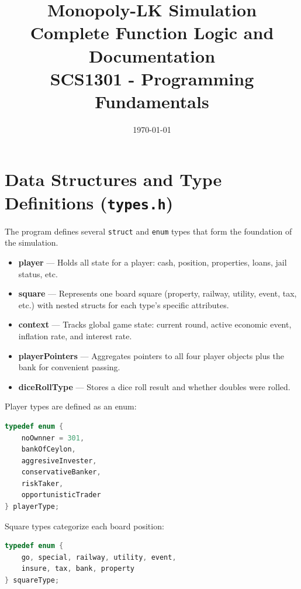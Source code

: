 \documentclass[12pt,a4paper]{article}
\title{
    \textbf{Monopoly-LK Simulation} \\
    \large Complete Function Logic and Documentation \\
    \vspace{0.5cm}
    \small SCS1301 - Programming Fundamentals
}
\author{}
\date{\today}
\begin{document}
\maketitle
\tableofcontents
\newpage

\section{Data Structures and Type Definitions (\texttt{types.h})}

The program defines several \texttt{struct} and \texttt{enum} types that form the foundation of the simulation.

\begin{tcolorbox}[colback=gray!10, colframe=gray!60, title=\textbf{Key Data Structures}]
\begin{itemize}[noitemsep]
    \item \textbf{player} --- Holds all state for a player: cash, position, properties, loans, jail status, etc.
    \item \textbf{square} --- Represents one board square (property, railway, utility, event, tax, etc.) with nested structs for each type's specific attributes.
    \item \textbf{context} --- Tracks global game state: current round, active economic event, inflation rate, and interest rate.
    \item \textbf{playerPointers} --- Aggregates pointers to all four player objects plus the bank for convenient passing.
    \item \textbf{diceRollType} --- Stores a dice roll result and whether doubles were rolled.
\end{itemize}
\end{tcolorbox}

Player types are defined as an enum:
\begin{lstlisting}[language=C]
typedef enum {
    noOwnner = 301,
    bankOfCeylon,
    aggresiveInvester,
    conservativeBanker,
    riskTaker,
    opportunisticTrader
} playerType;
\end{lstlisting}

Square types categorize each board position:
\begin{lstlisting}[language=C]
typedef enum {
    go, special, railway, utility, event,
    insure, tax, bank, property
} squareType;
\end{lstlisting}
\end{document}

